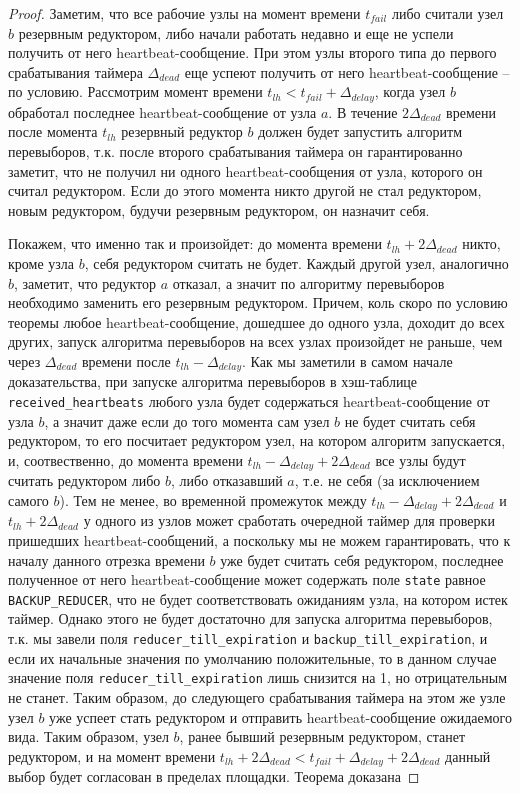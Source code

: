 \documentclass{article}
\theoremstyle{plain}
\theoremstyle{plain}
\theoremstyle{plain}
\theoremstyle{plain}
\theoremstyle{definition}
\theoremstyle{remark}
\theoremstyle{plain}
\begin{document}
\begin{proof}
    Заметим, что все рабочие узлы на момент времени $t_{fail}$ либо считали узел $b$ резервным редуктором, либо начали работать недавно и еще не успели получить от него heartbeat-сообщение. При этом узлы второго типа до первого срабатывания таймера $\Delta_{dead}$ еще успеют получить от него heartbeat-сообщение -- по условию. Рассмотрим момент времени $t_{lh} < t_{fail} + \Delta_{delay}$, когда узел $b$ обработал последнее heartbeat-сообщение от узла $a$. В течение $2\Delta_{dead}$ времени после момента $t_{lh}$ резервный редуктор $b$ должен будет запустить алгоритм перевыборов, т.к. после второго срабатывания таймера он гарантированно заметит, что не получил ни одного heartbeat-сообщения от узла, которого он считал редуктором. Если до этого момента никто другой не стал редуктором, новым редуктором, будучи резервным редуктором, он назначит себя.
    
    Покажем, что именно так и произойдет: до момента времени $t_{lh} + 2\Delta_{dead}$ никто, кроме узла $b$, себя редуктором считать не будет. Каждый другой узел, аналогично $b$, заметит, что редуктор $a$ отказал, а значит по алгоритму перевыборов необходимо заменить его резервным редуктором. Причем, коль скоро по условию теоремы любое heartbeat-сообщение, дошедшее до одного узла, доходит до всех других, запуск алгоритма перевыборов на всех узлах произойдет не раньше, чем через $\Delta_{dead}$ времени после $t_{lh} - \Delta_{delay}$. Как мы заметили в самом начале доказательства, при запуске алгоритма перевыборов в хэш-таблице \texttt{received\_heartbeats} любого узла будет содержаться heartbeat-сообщение от узла $b$, а значит даже если до того момента сам узел $b$ не будет считать себя редуктором, то его посчитает редуктором узел, на котором алгоритм запускается, и, соотвественно, до момента времени $t_{lh} - \Delta_{delay} + 2\Delta_{dead}$ все узлы будут считать редуктором либо $b$, либо отказавший $a$, т.е. не себя (за исключением самого $b$). Тем не менее, во временной промежуток между $t_{lh} - \Delta_{delay} + 2\Delta_{dead}$ и $t_{lh} + 2\Delta_{dead}$ у одного из узлов может сработать очередной таймер для проверки пришедших heartbeat-сообщений, а поскольку мы не можем гарантировать, что к началу данного отрезка времени $b$ уже будет считать себя редуктором, последнее полученное от него heartbeat-сообщение может содержать поле \texttt{state} равное \texttt{BACKUP\_REDUCER}, что не будет соответствовать ожиданиям узла, на котором истек таймер. Однако этого не будет достаточно для запуска алгоритма перевыборов, т.к. мы завели поля \texttt{reducer\_till\_expiration} и \texttt{backup\_till\_expiration}, и если их начальные значения по умолчанию положительные, то в данном случае значение поля \texttt{reducer\_till\_expiration} лишь снизится на 1, но отрицательным не станет. Таким образом, до следующего срабатывания таймера на этом же узле узел $b$ уже успеет стать редуктором и отправить heartbeat-сообщение ожидаемого вида. Таким образом, узел $b$, ранее бывший резервным редуктором, станет редуктором, и на момент времени $t_{lh} + 2\Delta_{dead} < t_{fail} + \Delta_{delay} + 2\Delta_{dead}$ данный выбор будет согласован в пределах площадки. Теорема доказана
\end{proof}
\end{document}
